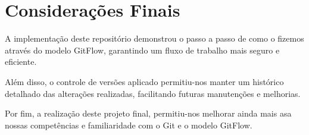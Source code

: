 \documentclass[a4paper,12pt]{article}
\begin{document}
\section{Considerações Finais}

A implementação deste repositório demonstrou o passo a passo de como o fizemos através do modelo GitFlow, garantindo um fluxo de trabalho mais seguro e eficiente.

Além disso, o controle de versões aplicado permitiu-nos manter um histórico detalhado das alterações realizadas, facilitando futuras manutenções e melhorias. 

Por fim, a realização deste projeto final, permitiu-nos melhorar ainda mais asa nossas competências e familiaridade com o Git e o modelo GitFlow.
\end{document}
